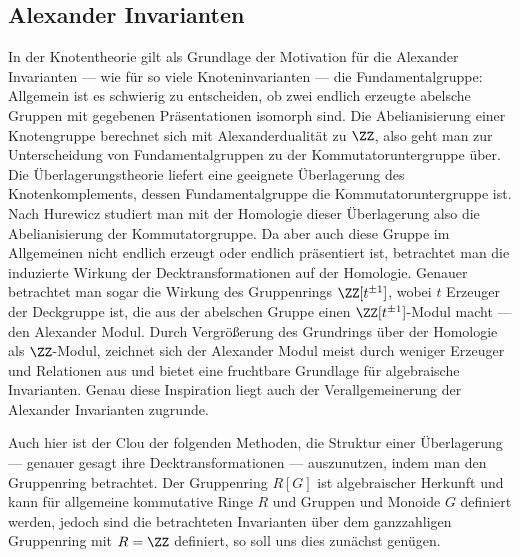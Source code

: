     \subsection{Alexander Invarianten}
     In der Knotentheorie gilt als Grundlage der Motivation für die Alexander Invarianten --- wie für so viele Knoteninvarianten --- die Fundamentalgruppe: Allgemein ist es schwierig zu entscheiden, ob zwei endlich erzeugte abelsche Gruppen mit gegebenen Präsentationen isomorph sind. Die Abelianisierung einer Knotengruppe berechnet sich mit Alexanderdualität zu $\ZZ$, also geht man zur Unterscheidung von Fundamentalgruppen zu der Kommutatoruntergruppe über. Die Überlagerungstheorie liefert eine geeignete Überlagerung des Knotenkomplements, dessen Fundamentalgruppe die Kommutatoruntergruppe ist. Nach Hurewicz studiert man mit der Homologie dieser Überlagerung also die Abelianisierung der Kommutatorgruppe. Da aber auch diese Gruppe im Allgemeinen nicht endlich erzeugt oder endlich präsentiert ist, betrachtet man die induzierte Wirkung der Decktransformationen auf der Homologie. Genauer betrachtet man sogar die Wirkung des Gruppenrings $\ZZ [t^{\pm 1}]$, wobei $t$ Erzeuger der Deckgruppe ist, die aus der abelschen Gruppe einen $\ZZ [t^{\pm 1}]$-Modul macht --- den Alexander Modul. Durch Vergrößerung des Grundrings über der Homologie als $\ZZ$-Modul, zeichnet sich der Alexander Modul meist durch weniger Erzeuger und Relationen aus und bietet eine fruchtbare Grundlage für algebraische Invarianten. Genau diese Inspiration liegt auch der Verallgemeinerung der Alexander Invarianten zugrunde.
    
    	Auch hier ist der Clou der folgenden Methoden, die Struktur einer Überlagerung --- genauer gesagt ihre Decktransformationen --- auszunutzen, indem man den Gruppenring betrachtet. Der Gruppenring $R[G]$ ist algebraischer Herkunft und kann für allgemeine kommutative Ringe $R$ und Gruppen und Monoide $G$ definiert werden, jedoch sind die betrachteten Invarianten über dem ganzzahligen Gruppenring mit $R=\ZZ$ definiert, so soll uns dies zunächst genügen.

